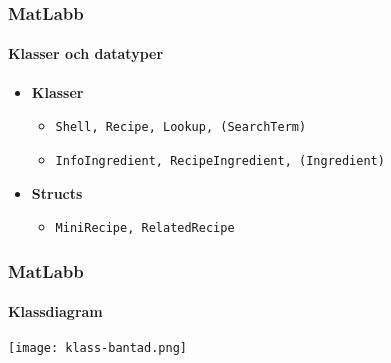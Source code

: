 \begin{frame}
  \frametitle{MatLabb}
  \framesubtitle{Klasser och datatyper}
  \begin{itemize}
  \item \textbf{Klasser}
    \begin{itemize}
    \item \texttt{Shell, Recipe, Lookup, (SearchTerm)}
    \item \texttt{InfoIngredient, RecipeIngredient, (Ingredient)}
    \end{itemize}
  \item \textbf{Structs}
    \begin{itemize}
    \item \texttt{MiniRecipe, RelatedRecipe}
    \end{itemize}
  \end{itemize}
\end{frame}

\begin{frame}
  \frametitle{MatLabb}
  \framesubtitle{Klassdiagram}
  \centering
  \texttt{[image: klass-bantad.png]}
\end{frame}
